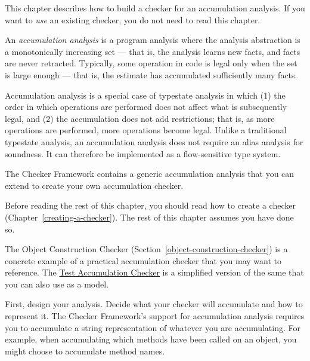 \htmlhr
{}


This chapter describes how to build a checker for an accumulation analysis.
If you want to \emph{use} an existing checker, you do not need to read this chapter.

An \emph{accumulation analysis} is a program analysis where the
analysis abstraction is a monotonically increasing set --- that is, the
analysis learns new facts, and facts are never retracted.
Typically, some operation in code is legal
only when the set is large enough --- that is, the estimate has accumulated
sufficiently many facts.

Accumulation analysis is a special case of typestate analysis in which
(1) the order in which operations are performed does not affect what is subsequently legal,
and (2) the accumulation does not add restrictions; that is, as
more operations are performed, more operations become legal.
Unlike a traditional typestate analysis, an accumulation analysis does
not require an alias analysis for soundness. It can therefore be implemented
as a flow-sensitive type system.

The Checker Framework contains a generic accumulation analysis that you can
extend to create your own accumulation checker.

Before reading the rest of this chapter, you should
read how to create a checker (Chapter~\ref{creating-a-checker}).
The rest of this chapter assumes you have done so.



The Object Construction Checker (Section~\ref{object-construction-checker})
is a concrete example of a practical accumulation checker that you may want
to reference. The
\href{https://github.com/typetools/checker-framework/blob/master/framework/src/test/java/testaccumulation/TestAccumulationChecker.java}{Test Accumulation Checker}
is a simplified version of the same that you can also use as a model.

First, design your analysis.  Decide what
your checker will accumulate and how to represent it. The Checker Framework's
support for accumulation analysis requires you to accumulate a string representation
of whatever you are accumulating. For example, when accumulating which methods have
been called on an object, you might choose to accumulate method names.

